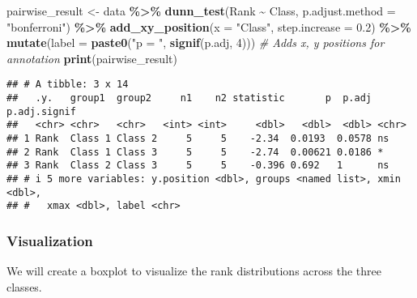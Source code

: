 \documentclass[
]{article}
\newenvironment{Shaded}{\begin{snugshade}}{\end{snugshade}}
\newcommand{\AttributeTok}[1]{\textcolor[rgb]{0.13,0.29,0.53}{#1}}
\newcommand{\CommentTok}[1]{\textcolor[rgb]{0.56,0.35,0.01}{\textit{#1}}}
\newcommand{\DecValTok}[1]{\textcolor[rgb]{0.00,0.00,0.81}{#1}}
\newcommand{\FloatTok}[1]{\textcolor[rgb]{0.00,0.00,0.81}{#1}}
\newcommand{\FunctionTok}[1]{\textcolor[rgb]{0.13,0.29,0.53}{\textbf{#1}}}
\newcommand{\NormalTok}[1]{#1}
\newcommand{\OtherTok}[1]{\textcolor[rgb]{0.56,0.35,0.01}{#1}}
\newcommand{\SpecialCharTok}[1]{\textcolor[rgb]{0.81,0.36,0.00}{\textbf{#1}}}
\newcommand{\StringTok}[1]{\textcolor[rgb]{0.31,0.60,0.02}{#1}}
\begin{document}
\begin{Shaded}
\begin{Highlighting}[]
\NormalTok{pairwise\_result }\OtherTok{\textless{}{-}}\NormalTok{ data }\SpecialCharTok{\%\textgreater{}\%}
  \FunctionTok{dunn\_test}\NormalTok{(Rank }\SpecialCharTok{\textasciitilde{}}\NormalTok{ Class, }\AttributeTok{p.adjust.method =} \StringTok{"bonferroni"}\NormalTok{) }\SpecialCharTok{\%\textgreater{}\%}
  \FunctionTok{add\_xy\_position}\NormalTok{(}\AttributeTok{x =} \StringTok{"Class"}\NormalTok{, }\AttributeTok{step.increase =} \FloatTok{0.2}\NormalTok{) }\SpecialCharTok{\%\textgreater{}\%}
  \FunctionTok{mutate}\NormalTok{(}\AttributeTok{label =} \FunctionTok{paste0}\NormalTok{(}\StringTok{"p = "}\NormalTok{, }\FunctionTok{signif}\NormalTok{(p.adj, }\DecValTok{4}\NormalTok{))) }\CommentTok{\# Adds x, y positions for annotation}
\FunctionTok{print}\NormalTok{(pairwise\_result)}
\end{Highlighting}
\end{Shaded}

\begin{verbatim}
## # A tibble: 3 x 14
##   .y.   group1  group2     n1    n2 statistic       p  p.adj p.adj.signif
##   <chr> <chr>   <chr>   <int> <int>     <dbl>   <dbl>  <dbl> <chr>       
## 1 Rank  Class 1 Class 2     5     5    -2.34  0.0193  0.0578 ns          
## 2 Rank  Class 1 Class 3     5     5    -2.74  0.00621 0.0186 *           
## 3 Rank  Class 2 Class 3     5     5    -0.396 0.692   1      ns          
## # i 5 more variables: y.position <dbl>, groups <named list>, xmin <dbl>,
## #   xmax <dbl>, label <chr>
\end{verbatim}

\subsubsection{Visualization}\label{visualization-1}

We will create a boxplot to visualize the rank distributions across the
three classes.
\end{document}
